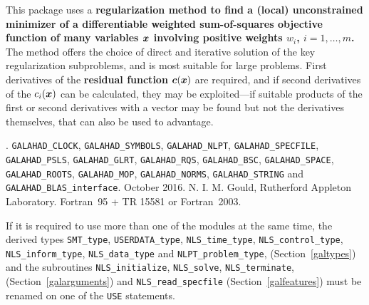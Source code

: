 \documentclass{galahad}
\newcommand{\packagename}{NLS}
\newcommand{\fullpackagename}{\libraryname\_\packagename}
\begin{document}
\galheader


\galsummary
This package uses a {\bf regularization method to find a (local)
unconstrained minimizer of a differentiable weighted sum-of-squares objective
function
of many variables ${\bm{x}}$ involving positive weights $w_i$, $i=1,\ldots,m$.}
The method offers the choice of direct and iterative solution of the key
regularization subproblems, and is most suitable for large problems.
First derivatives of the {\bf residual function}
${\bm{c}}({\bm{x}})$ are required, and if second derivatives of the
$c_i({\bm{x}})$ can be calculated, they may be exploited---if suitable products
of the first or second derivatives with a vector may be found but not the
derivatives themselves, that can also be used to advantage.


\galattributes
\galversions{\tt  \fullpackagename\_single, \fullpackagename\_double}.
\galuses
{\tt GALAHAD\_CLOCK},
{\tt GALAHAD\_SY\-M\-BOLS},
{\tt GALAHAD\_NLPT},
{\tt GALAHAD\_SPECFILE},
{\tt GALAHAD\_PSLS},
{\tt GALAHAD\_GLRT},
{\tt GALAHAD\_RQS},
{\tt GALAHAD\_BSC},
{\tt GALAHAD\_\-SPACE},
{\tt GALAHAD\_ROOTS},
{\tt GALAHAD\_MOP},
{\tt GALAHAD\_NORMS},
{\tt GALAHAD\_STRING}
and
{\tt GALAHAD\_BLAS\_interface}.
\galdate October 2016.
\galorigin N. I. M. Gould, Rutherford Appleton Laboratory.
\gallanguage Fortran~95 + TR 15581 or Fortran~2003.


\galhowto



\noindent
If it is required to use more than one of the modules at the same time, 
the derived types
{\tt SMT\_type},
{\tt USERDATA\_type},
{\tt \packagename\_time\_\-type},
{\tt \packagename\_control\_type},
{\tt \packagename\_inform\_type},
{\tt \packagename\_data\_type}
and
{\tt NLPT\_problem\_type},
(Section~\ref{galtypes})
and the subroutines
{\tt \packagename\_initialize},
{\tt \packagename\_\-solve},
{\tt \packagename\_terminate},
(Section~\ref{galarguments})
and
{\tt \packagename\_read\_specfile}
(Section~\ref{galfeatures})
must be renamed on one of the {\tt USE} statements.
\end{document}
